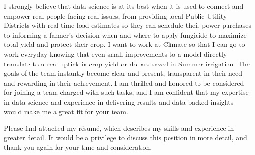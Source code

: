 \documentclass[14pt, a4paper]{awesome-cv}
\begin{document}
\begin{cvletter}
I strongly believe that data science is at its best when it is used to connect and empower real people facing real issues, from providing local Public Utility Districts with real-time load estimates so they can schedule their power purchases to informing a farmer's decision when and where to apply fungicide to maximize total yield and protect their crop. I want to work at Climate so that I can go to work everyday knowing that even small improvements to a model directly translate to a real uptick in crop yield or dollars saved in Summer irrigation. The goals of the team instantly become clear and present, transparent in their need and rewarding in their achievement. I am thrilled and honored to be considered for joining a team charged with such tasks, and I am confident that my expertise in data science and experience in delivering results and data-backed insights would make me a great fit for your team.

Please find attached my résumé, which describes my skills and experience in greater detail. It would be a privilege to discuss this position in more detail, and thank you again for your time and consideration.

\end{cvletter}

\makeletterclosing
\end{document}

